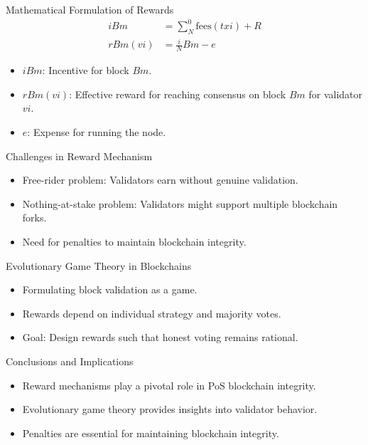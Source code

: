 \documentclass{beamer}
\begin{document}
\begin{frame}{Mathematical Formulation of Rewards}
\begin{align*}
iBm &= \sum_{N}^{0} \text{fees}(txi) + R \\
rBm(vi) &= \frac{i}{N}Bm - e
\end{align*}
\begin{itemize}
\item \( iBm \): Incentive for block \( Bm \).
\item \( rBm(vi) \): Effective reward for reaching consensus on block \( Bm \) for validator \( vi \).
\item \( e \): Expense for running the node.
\end{itemize}
\end{frame}

\begin{frame}{Challenges in Reward Mechanism}
\begin{itemize}
\item Free-rider problem: Validators earn without genuine validation.
\item Nothing-at-stake problem: Validators might support multiple blockchain forks.
\item Need for penalties to maintain blockchain integrity.
\end{itemize}
\end{frame}

\begin{frame}{Evolutionary Game Theory in Blockchains}
\begin{itemize}
\item Formulating block validation as a game.
\item Rewards depend on individual strategy and majority votes.
\item Goal: Design rewards such that honest voting remains rational.
\end{itemize}
\end{frame}

\begin{frame}{Conclusions and Implications}
\begin{itemize}
\item Reward mechanisms play a pivotal role in PoS blockchain integrity.
\item Evolutionary game theory provides insights into validator behavior.
\item Penalties are essential for maintaining blockchain integrity.
\end{itemize}
\end{frame}
\end{document}
